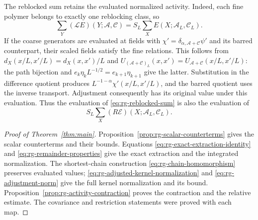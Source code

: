 The reblocked sum retains the evaluated normalized
activity. Indeed, each fine polymer belongs to exactly
one reblocking class, so
\begin{equation}\label{eq:rg-reblocked-sum}
 \sum_Y(\mathcal LE)(Y;\mathscr A,\mathscr C)
      =S_L\sum_X E(X;\mathscr A_L,\mathscr C_L).
\end{equation}
If the coarse generators are evaluated at fields
with $\chi'=\delta_{\alpha,\mathscr A+\mathscr C}\psi'$
and its barred counterpart, their scaled fields satisfy
the fine relations. This follows from
$d_X(x/L,x'/L)=d_X(x,x')/L$ and
$U_{(\mathscr A+\mathscr C)_L}(x,x')
 =U_{\mathscr A+\mathscr C}(x/L,x'/L)$:
the path bijection and
$e_k\eta_kL^{-1/2}=e_{k+1}\eta_{k+1}$ give the latter.
Substitution in the difference quotient produces
$L^{-1-\alpha}\chi'(x/L,x'/L)$, and the barred quotient
uses the inverse transport. Adjustment consequently
has its original value under this evaluation. Thus the
evaluation of \eqref{eq:rg-reblocked-sum} is also the
evaluation of
\[
 S_L\sum_X(R\mathscr E)(X;\mathscr A_L,\mathscr C_L).
\]
\begin{proof}[Proof of Theorem~\ref{thm:main}]
Proposition~\ref{prop:rg-scalar-counterterms} gives the scalar
counterterms and their bounds. Equations
\eqref{eq:rg-exact-extraction-identity} and
\eqref{eq:rg-remainder-properties} give the exact extraction and
the integrated normalization. The shortest-chain construction
\eqref{eq:rg-chain-homomorphism} preserves evaluated values;
\eqref{eq:rg-adjusted-kernel-normalization} and
\eqref{eq:rg-adjustment-norm} give the full kernel normalization
and its bound. Proposition~\ref{prop:rg-activity-contraction}
proves the contraction and the relative estimate. The covariance
and restriction statements were proved with each map.
\end{proof}
